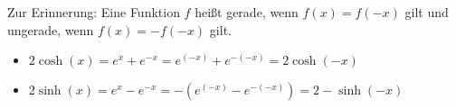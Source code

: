 \item Zur Erinnerung: Eine Funktion $f$ heißt gerade, wenn $f(x) =f(-x)$ gilt und ungerade, wenn $f(x) = -f(-x)$ gilt.

\begin{itemize}
	\item $2 \cosh(x) = e^x+e^{-x} =   e^{(-x)} + e^{-(-x)}  = 2  \cosh(-x)$
	\item $2 \sinh(x) = e^x-e^{-x} = -(e^{(-x)} - e^{-(-x)}) = 2 -\sinh(-x)$
\end{itemize}